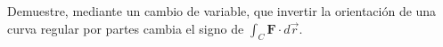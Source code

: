 Demuestre, mediante un cambio de variable, que invertir la orientación de una curva regular por partes cambia el signo de $\int_C\mathbf{F}\cdot d\vec r$.